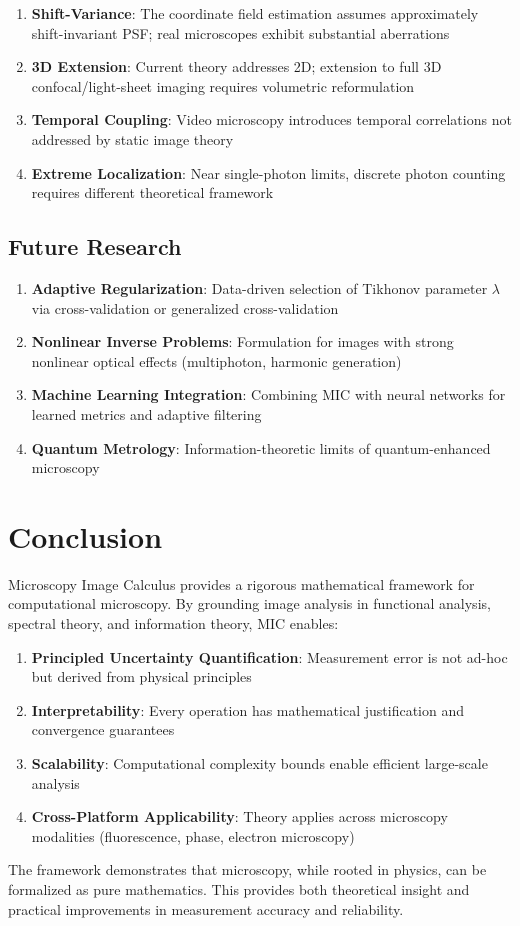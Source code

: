\documentclass[twocolumn,11pt]{article}
\begin{document}
\begin{enumerate}
\item \textbf{Shift-Variance}: The coordinate field estimation assumes approximately shift-invariant PSF; real microscopes exhibit substantial aberrations
\item \textbf{3D Extension}: Current theory addresses 2D; extension to full 3D confocal/light-sheet imaging requires volumetric reformulation
\item \textbf{Temporal Coupling}: Video microscopy introduces temporal correlations not addressed by static image theory
\item \textbf{Extreme Localization}: Near single-photon limits, discrete photon counting requires different theoretical framework
\end{enumerate}

\subsection{Future Research}

\begin{enumerate}
\item \textbf{Adaptive Regularization}: Data-driven selection of Tikhonov parameter $\lambda$ via cross-validation or generalized cross-validation
\item \textbf{Nonlinear Inverse Problems}: Formulation for images with strong nonlinear optical effects (multiphoton, harmonic generation)
\item \textbf{Machine Learning Integration}: Combining MIC with neural networks for learned metrics and adaptive filtering
\item \textbf{Quantum Metrology}: Information-theoretic limits of quantum-enhanced microscopy
\end{enumerate}

\section{Conclusion}

Microscopy Image Calculus provides a rigorous mathematical framework for computational microscopy. By grounding image analysis in functional analysis, spectral theory, and information theory, MIC enables:

\begin{enumerate}
\item \textbf{Principled Uncertainty Quantification}: Measurement error is not ad-hoc but derived from physical principles
\item \textbf{Interpretability}: Every operation has mathematical justification and convergence guarantees
\item \textbf{Scalability}: Computational complexity bounds enable efficient large-scale analysis
\item \textbf{Cross-Platform Applicability}: Theory applies across microscopy modalities (fluorescence, phase, electron microscopy)
\end{enumerate}

The framework demonstrates that microscopy, while rooted in physics, can be formalized as pure mathematics. This provides both theoretical insight and practical improvements in measurement accuracy and reliability.



\end{document}
